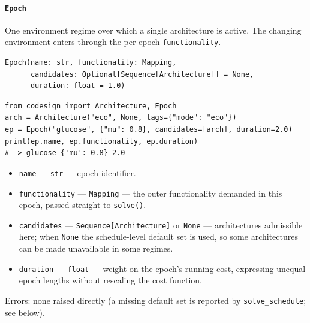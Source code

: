 \documentclass[11pt,a4paper]{article}
\begin{document}
\paragraph{\texttt{Epoch}}\label{ref:temporal:epoch}
One environment regime over which a single architecture is active. The
changing environment enters through the per-epoch \texttt{functionality}.
\begin{lstlisting}
Epoch(name: str, functionality: Mapping,
      candidates: Optional[Sequence[Architecture]] = None,
      duration: float = 1.0)
\end{lstlisting}
\begin{lstlisting}
from codesign import Architecture, Epoch
arch = Architecture("eco", None, tags={"mode": "eco"})
ep = Epoch("glucose", {"mu": 0.8}, candidates=[arch], duration=2.0)
print(ep.name, ep.functionality, ep.duration)
# -> glucose {'mu': 0.8} 2.0
\end{lstlisting}
\begin{itemize}[nosep]
  \item \texttt{name} --- \texttt{str} --- epoch identifier.
  \item \texttt{functionality} --- \texttt{Mapping} --- the outer
    functionality demanded in this epoch, passed straight to
    \texttt{solve()}.
  \item \texttt{candidates} --- \texttt{Sequence[Architecture]} or
    \texttt{None} --- architectures admissible here; when \texttt{None} the
    schedule-level default set is used, so some architectures can be made
    unavailable in some regimes.
  \item \texttt{duration} --- \texttt{float} --- weight on the epoch's
    running cost, expressing unequal epoch lengths without rescaling the
    cost function.
\end{itemize}
Errors: none raised directly (a missing default set is reported by
\texttt{solve\_schedule}; see below).
\end{document}
